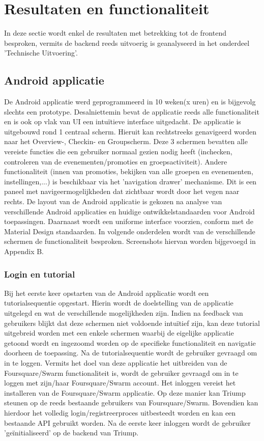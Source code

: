 
\chapter{Resultaten en functionaliteit}
In deze sectie wordt enkel de resultaten met betrekking tot de frontend besproken, vermits de backend reeds uitvoerig is geanalyseerd in het onderdeel 'Technische Uitvoering'.
\section{Android applicatie}
De Android applicatie werd geprogrammeerd in 10 weken(x uren) en is bijgevolg slechts een prototype. Desalniettemin bevat de applicatie reeds alle functionaliteit en is ook op vlak van UI een intuïtieve interface uitgedacht.
De applicatie is uitgebouwd rond 1 centraal scherm. Hieruit kan rechtstreeks genavigeerd worden naar het Overview-, Checkin- en Groupscherm. Deze 3 schermen bevatten alle vereiste functies die een gebruiker normaal gezien nodig heeft (inchecken, controleren van de evenementen/promoties en groepsactiviteit). Andere functionaliteit (innen van promoties, bekijken van alle groepen en evenementen, instellingen,...) is beschikbaar via het 'navigation drawer' mechanisme. Dit is een paneel met navigeermogelijkheden dat zichtbaar wordt door het vegen naar rechts. De layout van de Android applicatie is gekozen na analyse van verschillende Android applicaties en huidige ontwikkelstandaarden voor Android toepassingen. Daarnaast wordt een uniforme interface voorzien, conform met de Material Design standaarden. In volgende onderdelen wordt van de verschillende schermen de functionaliteit besproken. Screenshots hiervan worden bijgevoegd in Appendix B.
\subsection{Login en tutorial} %
Bij het eerste keer opstarten van de Android applicatie wordt een tutorialsequentie opgestart. Hierin wordt de doelstelling van de applicatie uitgelegd en wat de verschillende mogelijkheden zijn. Indien na feedback van gebruikers blijkt dat deze schermen niet voldoende intuïtief zijn, kan deze tutorial uitgebreid worden met een enkele schermen waarbij de eigelijke applicatie getoond wordt en ingezoomd worden op de specifieke functionaliteit en navigatie doorheen de toepassing. 
Na de tutorialsequentie wordt de gebruiker gevraagd om in te loggen. Vermits het doel van deze applicatie het uitbreiden van de Foursquare/Swarm functionaliteit is, wordt de gebruiker gevraagd om in te loggen met zijn/haar Foursquare/Swarm account. Het inloggen vereist het installeren van de Foursquare/Swarm applicatie. Op deze manier kan Triump steunen op de reeds bestaande gebruikers van Foursquare/Swarm. Bovendien kan hierdoor het volledig login/registreerproces uitbesteedt worden en kan een bestaande API gebruikt worden.
Na de eerste keer inloggen wordt de gebruiker 'geïnitialiseerd' op de backend van Triump.
